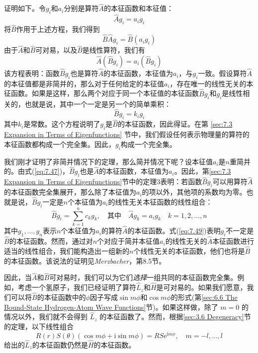     证明如下。令$g_i$和$a_i$分别是算符$\hat{A}$的本征函数和本征值：
    \begin{equation*}
        \hat{A}g_i = a_ig_i
    \end{equation*}
    将$\hat{B}$作用于上述方程，我们得到
    \begin{equation*}
        \hat{B}\hat{A}g_i = \hat{B}\left(a_ig_i\right)
    \end{equation*}
    由于$\hat{A}$和$\hat{B}$可对易，以及$\hat{B}$是线性算符，我们有
    \begin{equation}
        \hat{A}\left(\hat{B}g_i\right) = a_i\left(\hat{B}g_i\right)
        \label{eq:7.47}
    \end{equation}
    该方程表明：函数$\hat{B}g_i$也是算符$\hat{A}$的本征函数，本征值为$a_i$，与$g_i$一致。假设算符$\hat{A}$的本征值都是非简并的，那么对于任何给定的本征值$a_i$，存在唯一的线性无关的本征函数。如果是这样，那么两个对应于同一个本征值的本征函数$\hat{B}g_i$和$g_i$是线性相关的，也就是说，其中一个一定是另一个的简单乘积：
    \begin{equation}
        \hat{B}g_i = k_ig_i
        \label{eq:7.48}
    \end{equation}
    其中$k_i$是常数。这个方程说明了$g_i$是$\hat{B}$的本征函数，因此得证。在第 \ref{sec:7.3 Expansion in Terms of Eigenfunctions} 节中，我们假设任何表示物理量的算符的本征函数都构成一个完全集。因此，$g_i$构成一个完全集。

    我们刚才证明了非简并情况下的定理，那么简并情况下呢？设本征值$a_i$是$n$重简并的。由式(\ref{eq:7.47})，$\hat{B}g_i$也是$\hat{A}$的本征函数，本征值为$a_i$。因此，第\ref{sec:7.3 Expansion in Terms of Eigenfunctions}节中的定理3表明：若函数$\hat{B}g_i$可以用算符$\hat{A}$的本征函数完全集展开，那么除了本征值为$a_i$的项以外，其他项的系数均为零。也就是说，$\hat{B}g_i$一定是$n$个本征值为$a_i$的线性无关本征函数的线性组合：
    \begin{equation}
        \hat{B}g_i = \sum_{k=1}^{n}c_kg_k, \quad \text{其中} \quad \hat{A}g_k = a_ig_k \quad k = 1,2,\ldots,n
        \label{eq:7.49}
    \end{equation}
    其中$g_1,\ldots,g_n$表示$n$个本征值为$a_i$的算符$\hat{A}$的本征函数。式(\ref{eq:7.49})表明$g_i$不一定是$\hat{B}$的本征函数。然而，通过对$n$个对应于简并本征值$a_i$的线性无关的$\hat{A}$本征函数进行适当的线性组合，我们能构造出一组新的$n$个线性无关的本征函数，他们也将是$\hat{B}$的本征函数。该说法的证明见\textit{Merzbacher}，第8.5节。

    因此，当$\hat{A}$和$\hat{B}$可对易时，我们可以为它们\textit{选择}一组共同的本征函数完全集。例如，考虑一个氢原子，我们已经证明了算符$\hat{L}_z$和$\hat{H}$是可对易的。如果我们愿意，我们可以将$\hat{B}$的本征函数中的$\phi$因子写成$\sin m\phi$和$\cos m\phi$的形式(第\ref{sec:6.6 The Bound-State Hydrogen-Atom Wave Functions}节)。如果这样做，除了 $m=0$ 的情况以外，我们就不会得到 $\hat{L}_z$ 的本征函数了。然而，根据\ref{sec:3.6 Degeneracy}节的定理，以下线性组合
    \begin{equation*}
        R\left(r\right)S\left(\theta\right)\left(\cos m\phi+\mathrm{i}\sin m\phi\right) = RS\mathrm{e}^{\mathrm{i}m\phi}, \quad m = -l,\ldots,l
    \end{equation*}
    给出的$\hat{L}_z$的本征函数仍然是$\hat{H}$的本征函数。

